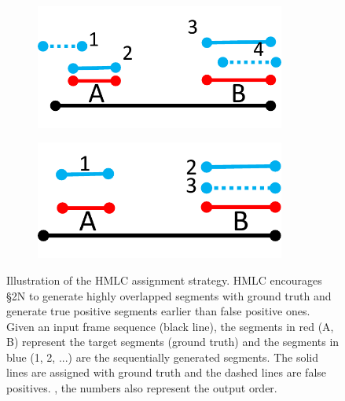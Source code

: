 \documentclass[10pt,journal,compsoc]{IEEEtran}
\begin{document}
\begin{figure}[t]
\begin{subfigure}[b]{0.18\textwidth}
        \caption{\label{fig:HMLC_r1}}
   \end{subfigure}   
     \begin{subfigure}[b]{0.18\textwidth}
   	\includegraphics[width=0.9\textwidth]{figures/Matching/HMLC_r2.pdf}
        \caption{\label{fig:HMLC_r2}}
   \end{subfigure}  
        \begin{subfigure}[b]{0.18\textwidth}
   	\includegraphics[width=0.9\textwidth]{figures/Matching/HMLC_r3.pdf}
        \caption{\label{fig:HMLC_r3}}
   \end{subfigure}  
   \caption{Illustration of the HMLC assignment strategy. HMLC encourages \S2N to generate highly overlapped segments with ground truth and generate true positive segments earlier than false positive ones. Given an input frame sequence (black line), the segments in red (A, B) represent the target segments (ground truth) and the segments in blue (1, 2, ...) are the sequentially generated segments. The solid lines are assigned with ground truth and the dashed lines are false positives.
   , the numbers also represent the output order. \label{fig:HMLC-illurstration}}
\end{figure}   
\end{document}
